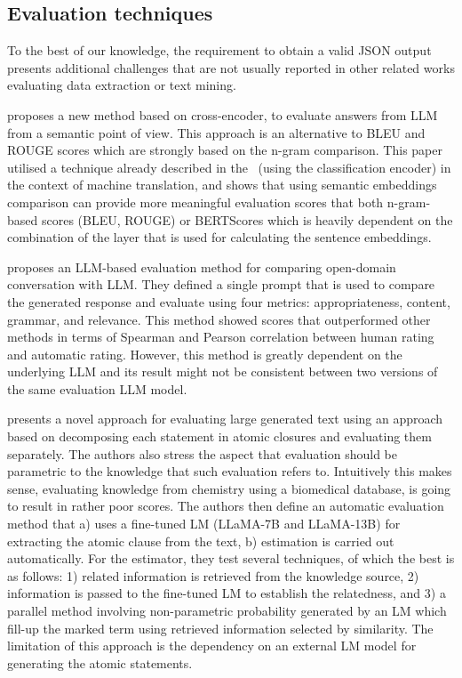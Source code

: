 \subsection{Evaluation techniques}

To the best of our knowledge, the requirement to obtain a valid JSON output presents additional challenges that are not usually reported in other related works evaluating data extraction or text mining. 

\cite{risch2021semantic} proposes a new method based on cross-encoder, to evaluate answers from LLM from a semantic point of view. This approach is an alternative to BLEU and ROUGE scores which are strongly based on the n-gram comparison. This paper utilised a technique already described in the~\cite{reimers2019sentencebert} (using the classification encoder) in the context of machine translation, and shows that using semantic embeddings comparison can provide more meaningful evaluation scores that both n-gram-based scores (BLEU, ROUGE) or BERTScores which is heavily dependent on the combination of the layer that is used for calculating the sentence embeddings. 

\cite{lin2023llmeval} proposes an LLM-based evaluation method for comparing open-domain conversation with LLM. They defined a single prompt that is used to compare the generated response and evaluate using four metrics: appropriateness, content, grammar, and relevance. 
This method showed scores that outperformed other methods in terms of Spearman and Pearson correlation between human rating and automatic rating. 
However, this method is greatly dependent on the underlying LLM and its result might not be consistent between two versions of the same evaluation LLM model. 

\cite{min2023factscore} presents a novel approach for evaluating large generated text using an approach based on decomposing each statement in atomic closures and evaluating them separately. 
The authors also stress the aspect that evaluation should be parametric to the knowledge that such evaluation refers to. Intuitively this makes sense, evaluating knowledge from chemistry using a biomedical database, is going to result in rather poor scores. 
The authors then define an automatic evaluation method that a) uses a fine-tuned LM (LLaMA-7B and LLaMA-13B) for extracting the atomic clause from the text, b) estimation is carried out automatically. 
For the estimator, they test several techniques, of which the best is as follows: 1) related information is retrieved from the knowledge source, 2) information is passed to the fine-tuned LM to establish the relatedness, and 3) a parallel method involving non-parametric probability generated by an LM which fill-up the marked term using retrieved information selected by similarity. 
The limitation of this approach is the dependency on an external LM model for generating the atomic statements. 